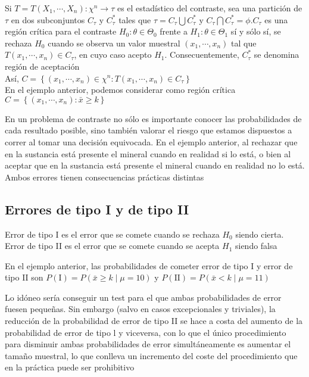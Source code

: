Si $T=T\left(X_{1}, \cdots, X_{n}\right): \chi^{n} \rightarrow \tau$ es el estadístico del contraste, sea una partición de $\tau$ en dos subconjuntos $C_{\tau}$ y $C_{\tau}^{*}$ tales que $\tau=C_{\tau} \bigcup C_{\tau}^{*}$ y $C_{\tau} \bigcap C_{\tau}^{*}=\phi . C_{\tau}$ es una región crítica para el contraste $H_{0}: \theta \in \Theta_{0}$ frente a $H_{1}: \theta \in \Theta_{1}$ sí y sólo sí, se rechaza $H_{0}$ cuando se observa un valor muestral $\left(x_{1}, \cdots, x_{n}\right)$ tal que $T\left(x_{1}, \cdots, x_{n}\right) \in C_{\tau}$, en cuyo caso acepto $H_{1}$. Consecuentemente, $C_{\tau}^{*}$ se denomina región de aceptación\\
Así, $C=\left\{\left(x_{1}, \cdots, x_{n}\right) \in \chi^{n}: T\left(x_{1}, \cdots, x_{n}\right) \in C_{\tau}\right\}$\\
En el ejemplo anterior, podemos considerar como región crítica $C=\left\{\left(x_{1}, \cdots, x_{n}\right): \bar{x} \geq k\right\}$

En un problema de contraste no sólo es importante conocer las probabilidades de cada resultado posible, sino también valorar el riesgo que estamos dispuestos a correr al tomar una decisión equivocada. En el ejemplo anterior, al rechazar que en la sustancia está presente el mineral cuando en realidad si lo está, o bien al aceptar que en la sustancia está presente el mineral cuando en realidad no lo está. Ambos errores tienen consecuencias prácticas distintas

\subsection{Errores de tipo I y de tipo II}
Error de tipo I es el error que se comete cuando se rechaza $H_{0}$ siendo cierta. Error de tipo II es el error que se comete cuando se acepta $H_{1}$ siendo falsa

En el ejemplo anterior, las probabilidades de cometer error de tipo I y error de tipo II son $P(\mathrm{I})=P(\bar{x} \geq k \mid \mu=10)$ y $P(\mathrm{II})=P(\bar{x}<k \mid \mu=11)$

Lo idóneo sería conseguir un test para el que ambas probabilidades de error fuesen pequeñas. Sin embargo (salvo en casos excepcionales y triviales), la reducción de la probabilidad de error de tipo II se hace a costa del aumento de la probabilidad de error de tipo l y viceversa, con lo que el único procedimiento para disminuir ambas probabilidades de error simultáneamente es aumentar el tamaño muestral, lo que conlleva un incremento del coste del procedimiento que en la práctica puede ser prohibitivo

